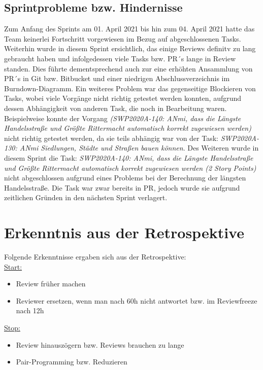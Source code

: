 \documentclass[12pt,a4paper, oneside]{article}
\begin{document}
\subsection{Sprintprobleme bzw. Hindernisse}
Zum Anfang des Sprints am 01. April 2021 bis hin zum 04. April 2021 hatte das Team keinerlei Fortschritt vorgewiesen im Bezug auf abgeschlossenen Tasks.
Weiterhin wurde in diesem Sprint ersichtlich, das einige Reviews definitv zu lang gebraucht haben und infolgedessen viele Tasks bzw. PR´s lange in Review standen.
Dies führte dementsprechend auch zur eine erhöhten Ansammlung von PR´s in Git bzw. Bitbucket und einer niedrigen Abschlussverzeichnis im Burndown-Diagramm.
Ein weiteres Problem war das gegenseitige Blockieren von Tasks, wobei viele Vorgänge nicht richtig getestet werden konnten, aufgrund dessen Abhängigkeit von anderen Task, die noch in Bearbeitung waren.
Beispielweise konnte der Vorgang \textit{ (SWP2020A-140: ANmi, dass die Längste Handelsstraße und Größte Rittermacht automatisch korrekt zugewiesen werden)} nicht richtig getestet werden, da sie teils abhängig war von der Task: \textit{SWP2020A-130: ANmi Siedlungen, Städte und Straßen bauen können}.
Des Weiteren wurde in diesem Sprint die Task: \textit{SWP2020A-140: ANmi, dass die Längste Handelsstraße und Größte Rittermacht automatisch korrekt zugewiesen werden (2 Story Points)} nicht abgeschlossen aufgrund eines Problems bei der Berechnung der längsten Handelsstraße.
Die Task war zwar bereits in PR, jedoch wurde sie aufgrund zeitlichen Gründen in den nächsten Sprint verlagert.


\section{Erkenntnis aus der Retrospektive}
Folgende Erkenntnisse ergaben sich aus der Retrospektive:\\

\underline{Start:}
\begin{itemize}
    \item Review früher machen
    \item Reviewer ersetzen, wenn man nach 60h nicht antwortet bzw. im Reviewfreeze nach 12h
\end{itemize}

\underline{Stop:}
\begin{itemize}
    \item Review hinauszögern bzw. Reviews brauchen zu lange
    \item Pair-Programming bzw. Reduzieren
\end{itemize}
\end{document}
